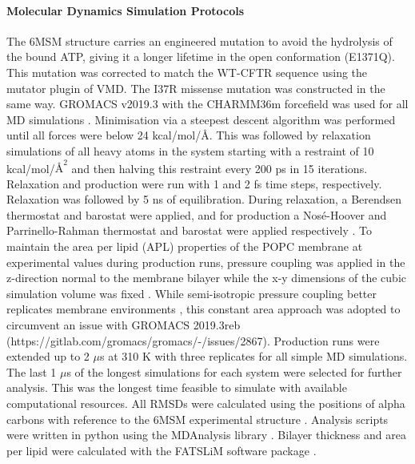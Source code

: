 \paragraph{Molecular Dynamics Simulation Protocols} The 6MSM structure carries an engineered mutation to avoid the hydrolysis of the bound ATP, giving it a longer lifetime in the open conformation (E1371Q). This mutation was corrected to match the WT-CFTR sequence using the mutator plugin of VMD. The I37R missense mutation was constructed in the same way. GROMACS v2019.3 with the CHARMM36m forcefield was used for all MD simulations \cite{abraham2015, huang2016}. Minimisation via a steepest descent algorithm was performed until all forces were below 24 kcal/mol/$\mbox{\AA}$. This was followed by relaxation simulations of all heavy atoms in the system starting with a restraint of 10 kcal/mol/$\mbox{\AA}^2$ and then halving this restraint every 200 ps in 15 iterations. Relaxation and production were run with 1 and 2 fs time steps, respectively. Relaxation was followed by 5 ns of equilibration. During relaxation, a Berendsen thermostat and barostat were applied, and for production a Nos\'e-Hoover and Parrinello-Rahman thermostat and barostat were applied respectively \cite{berendsen1984,nose1983,parrinello1981}. To maintain the area per lipid (APL) properties of the POPC membrane at experimental values during production runs, pressure coupling was applied in the z-direction normal to the membrane bilayer while the x-y dimensions of the cubic simulation volume was fixed \cite{klauda2010}. While semi-isotropic pressure coupling better replicates membrane environments \cite{pandit2009}, this constant area approach was adopted to circumvent an issue with GROMACS 2019.3reb (https://gitlab.com/gromacs/gromacs/-/issues/2867). Production runs were extended up to 2 $\mu$s at 310 K with three replicates for all simple MD simulations. The last 1 $\mu$s of the longest simulations for each system were selected for further analysis. This was the longest time feasible to simulate with available computational resources. All RMSDs were calculated using the positions of alpha carbons with reference to the 6MSM experimental structure \cite{zhang2018a}. Analysis scripts were written in python using the MDAnalysis library \cite{gowers2016,michaud-agrawal2011}. Bilayer thickness and area per lipid were calculated with the FATSLiM software package \cite{buchoux2017}.

